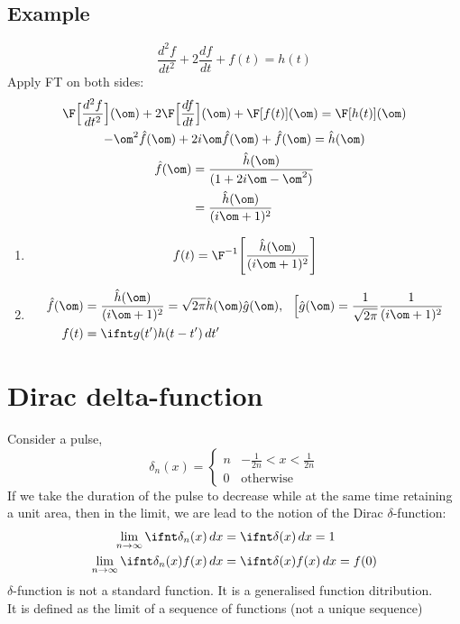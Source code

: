 \documentclass[a4paper, 11pt, normalem]{report}
\begin{document}
\subsection{Example}
\begin{equation*}
    \frac{d^2 f}{dt^2} + 2\frac{df}{dt} + f(t) = h(t)
\end{equation*}
Apply FT on both sides:
\begin{gather*}
    \F\Big[\frac{d^2 f}{dt^2}\Big](\om) + 2\F\Big[\frac{df}{dt}\Big](\om) + \F[f(t)](\om) = \F[h(t)](\om) \\
    -\om^2 \hat{f}(\om) + 2i\om \hat{f}(\om) + \hat{f}(\om) = \hat{h}(\om) \\
    \begin{aligned}
        \hat{f}(\om) &= \frac{\hat{h}(\om)}{(1 + 2i\om - \om^2)} \\
        &= \frac{\hat{h}(\om)}{(i\om + 1)^2}
    \end{aligned}
\end{gather*}
\begin{enumerate}
    \item   \begin{equation*}
                f(t) = \F^{-1}\Bigg[\frac{\hat{h}(\om)}{(i\om + 1)^2}\Bigg]
            \end{equation*}
    \item   \begin{align*}
                \hat{f}(\om) &= \frac{\hat{h}(\om)}{(i\om + 1)^2} = \sqrt{2\pi}\hat{h}(\om) \hat{g}(\om),~~ \Big[\hat{g}(\om) = \frac{1}{\sqrt{2\pi}} \frac{1}{(i\om + 1)^2} \\
                f(t) &= \ifnt g(t')h(t - t')\,dt'
            \end{align*}
\end{enumerate}

\section{Dirac delta-function}
Consider a pulse,
\begin{equation*}
    \delta_n (x) =  \begin{cases}
                        n & -\tfrac{1}{2n} < x < \tfrac{1}{2n} \\
                        0 & \text{otherwise}
                    \end{cases}
\end{equation*}
If we take the duration of the pulse to decrease while at the same time retaining a unit area, then in the limit, we are lead to the notion of the Dirac $\delta$-function:
\begin{align*}
    \lim_{n \to \infty} \ifnt \delta_n (x)\,dx &= \ifnt \delta(x)\,dx = 1 \\
    \lim_{n \to \infty} \ifnt \delta_n (x) f(x)\,dx &= \ifnt \delta(x)f(x)\,dx = f(0)
\end{align*}
$\delta$-function is not a standard function. It is a generalised function ditribution. \\
It is defined as the limit of a sequence of functions (not a unique sequence)
\end{document}
